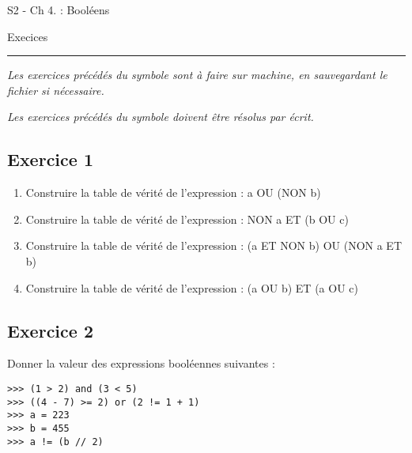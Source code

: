 \documentclass[11pt,a4paper]{article}
\renewcommand{\theenumi}{\textbf{\arabic{enumi}}}
\renewcommand{\labelenumi}{\textbf{\theenumi.}}
\renewcommand{\emph}{\textit}
\providecommand{\tightlist}{\setlength{\itemsep}{0pt}\setlength{\parskip}{0pt}}
\begin{document}
    
    
     
    \chead{} 
    \cfoot{}
    \renewcommand{\headrulewidth}{0pt}
    \renewcommand{\footrulewidth}{0pt}
    
    \Huge S2 - Ch 4. : Booléens  

    \vspace{.25cm}
    \normalsize Execices  
    
    \vspace{.25cm}
    \hrule
    
    \vspace{.5cm}

\emph{Les exercices précédés du symbole \faDesktop
sont à faire sur machine, en sauvegardant le fichier si nécessaire.}

\emph{Les exercices précédés du symbole \faPencil* doivent
être résolus par écrit.}

\hypertarget{octicons-pencil-16-exercice-1}{%
\subsection*{\faPencil* Exercice
1}\label{octicons-pencil-16-exercice-1}}

\begin{enumerate}
\def\labelenumi{\arabic{enumi}.}
\tightlist
\item
  Construire la table de vérité de l'expression : a OU (NON b)
\item
  Construire la table de vérité de l'expression : NON a ET (b OU c)
\item
  Construire la table de vérité de l'expression : (a ET NON b) OU (NON a
  ET b)
\item
  Construire la table de vérité de l'expression : (a OU b) ET (a OU c)
\end{enumerate}

 

\hypertarget{octicons-pencil-16-exercice-2}{%
\subsection*{\faPencil* Exercice
2}\label{octicons-pencil-16-exercice-2}}

Donner la valeur des expressions booléennes suivantes :

\begin{center}
\begin{minipage}{6cm}
\begin{lstlisting}
>>> (1 > 2) and (3 < 5)
>>> ((4 - 7) >= 2) or (2 != 1 + 1)
>>> a = 223
>>> b = 455
>>> a != (b // 2)
\end{lstlisting}
\end{minipage}
\end{center}
\end{document}
